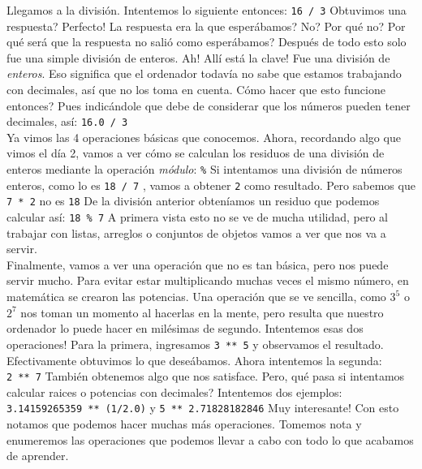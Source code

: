 \documentclass[10pt,letterpaper]{article}
\newcommand{\inlinecode}[1]{
\colorbox{light-gray}{\texttt{#1}}
}
\begin{document}
Llegamos a la divisi\'on. Intentemos lo siguiente entonces: \inlinecode{16\ /\ 3} Obtuvimos una respuesta? Perfecto! La respuesta era la que esper\'abamos? No? Por qu\'e no? Por qu\'e ser\'a que la respuesta no sali\'o como esper\'abamos? Despu\'es de todo esto solo fue una simple divisi\'on de enteros. Ah! All\'i est\'a la clave! Fue una divisi\'on de \emph{enteros}. Eso significa que el ordenador todav\'ia no sabe que estamos trabajando con decimales, as\'i que no los toma en cuenta. C\'omo hacer que esto funcione entonces? Pues indic\'andole que debe de considerar que los n\'umeros pueden tener decimales, as\'i: \inlinecode{16.0\ /\ 3}\\

Ya vimos las 4 operaciones b\'asicas que conocemos. Ahora, recordando algo que vimos el d\'ia 2, vamos a ver c\'omo se calculan los residuos de una divisi\'on de enteros mediante la operaci\'on \emph{m\'odulo}: \inlinecode{\%} Si intentamos una divisi\'on de n\'umeros enteros, como lo es \inlinecode{18\ /\ 7}, vamos a obtener \inlinecode{2} como resultado. Pero sabemos que \inlinecode{7\ *\ 2} no es \inlinecode{18} De la divisi\'on anterior obten\'iamos un residuo que podemos calcular as\'i: \inlinecode{18\ \%\ 7} A primera vista esto no se ve de mucha utilidad, pero al trabajar con listas, arreglos o conjuntos de objetos vamos a ver que nos va a servir.\\

Finalmente, vamos a ver una operaci\'on que no es tan b\'asica, pero nos puede servir mucho. Para evitar estar multiplicando muchas veces el mismo n\'umero, en matem\'atica se crearon las potencias. Una operaci\'on que se ve sencilla, como $3^{5}$ o $2^{7}$ nos toman un momento al hacerlas en la mente, pero resulta que nuestro ordenador lo puede hacer en mil\'esimas de segundo. Intentemos esas dos operaciones! Para la primera, ingresamos \inlinecode{3\ **\ 5} y observamos el resultado. Efectivamente obtuvimos lo que dese\'abamos. Ahora intentemos la segunda: \inlinecode{2\ **\ 7} Tambi\'en obtenemos algo que nos satisface. Pero, qu\'e pasa si intentamos calcular raices o potencias con decimales? Intentemos dos ejemplos: \inlinecode{3.14159265359\ **\ (1/2.0)} y \inlinecode{5\ **\ 2.71828182846} Muy interesante! Con esto notamos que podemos hacer muchas m\'as operaciones. Tomemos nota y enumeremos las operaciones que podemos llevar a cabo con todo lo que acabamos de aprender.
\end{document}

